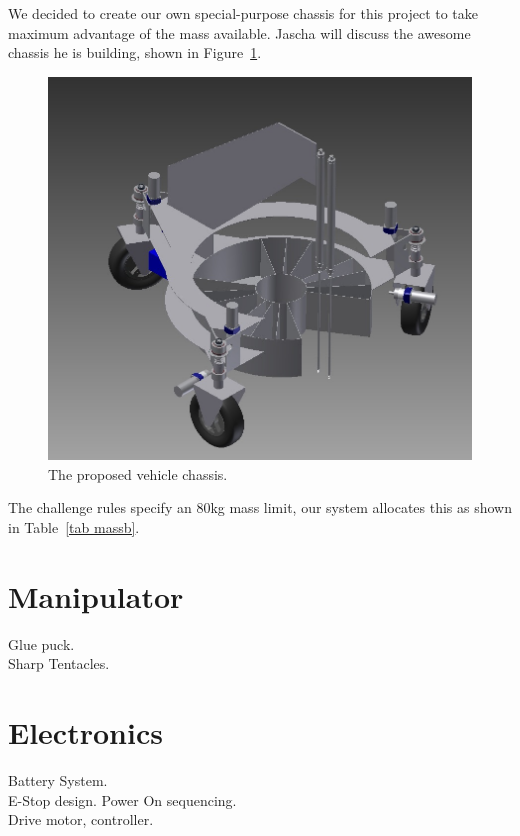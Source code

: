 \documentclass[12pt]{article}
\begin{document}
We decided to create our own special-purpose chassis for this project to take maximum advantage of the mass available. Jascha will discuss the awesome chassis he is building, shown in Figure~\ref{fig_bot_chassis}.

\begin{figure}[htbp]
\centering
\includegraphics[width=4.5in]{../assets/Frame.jpg}
\caption{The proposed vehicle chassis.}
\label{fig_bot_chassis}
\end{figure}

The challenge rules specify an 80kg mass limit, our system allocates this as shown in Table~\ref{tab massb}.


\section{Manipulator}\label{Manipulator}

Glue puck.\\

Sharp Tentacles.\\

\section{Electronics}\label{Electronics}

Battery System.\\

E-Stop design. Power On sequencing.\\

Drive motor, controller.\\
\end{document}
